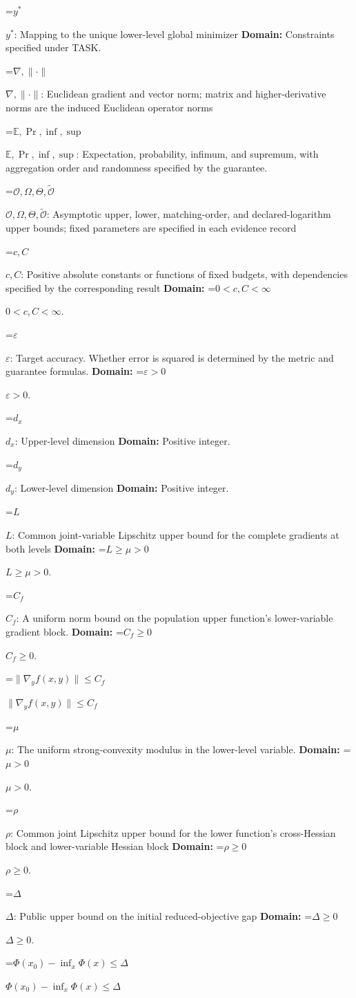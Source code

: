 \documentclass[10pt,a4paper]{article}
\newcommand{\AtlasMath}[1]{\par\begingroup\centering\setbox0=\hbox{$\displaystyle #1$}\ifdim\wd0>1.4\linewidth\typeout{ATLAS WIDE FORMULA: \the\wd0}\fi\ifdim\wd0>\linewidth\resizebox{\linewidth}{!}{\box0}\else\box0\fi\par\endgroup}
\newcommand{\AtlasInlineMath}[1]{\begingroup\setbox0=\hbox{$#1$}\ifdim\wd0>.4\linewidth\endgroup\AtlasMath{#1}\else\endgroup$#1$\fi}
\begin{document}
\AtlasInlineMath{y^*}: Mapping to the unique lower-level global minimizer \textbf{Domain:} Constraints specified under TASK.

\AtlasInlineMath{\nabla,\|\cdot\|}: Euclidean gradient and vector norm; matrix and higher-derivative norms are the induced Euclidean operator norms

\AtlasInlineMath{\mathbb E,\Pr,\inf,\sup}: Expectation, probability, infimum, and supremum, with aggregation order and randomness specified by the guarantee.

\AtlasInlineMath{\mathcal O,\Omega,\Theta,\widetilde{\mathcal O}}: Asymptotic upper, lower, matching-order, and declared-logarithm upper bounds; fixed parameters are specified in each evidence record

\AtlasInlineMath{c,C}: Positive absolute constants or functions of fixed budgets, with dependencies specified by the corresponding result \textbf{Domain:} \AtlasInlineMath{0<c,C<\infty}.

\AtlasInlineMath{\varepsilon}: Target accuracy. Whether error is squared is determined by the metric and guarantee formulas. \textbf{Domain:} \AtlasInlineMath{\varepsilon>0}.

\AtlasInlineMath{d_x}: Upper-level dimension \textbf{Domain:} Positive integer.

\AtlasInlineMath{d_y}: Lower-level dimension \textbf{Domain:} Positive integer.

\AtlasInlineMath{L}: Common joint-variable Lipschitz upper bound for the complete gradients at both levels \textbf{Domain:} \AtlasInlineMath{L\ge\mu>0}.

\AtlasInlineMath{C_f}: A uniform norm bound on the population upper function’s lower-variable gradient block. \textbf{Domain:} \AtlasInlineMath{C_f\ge0}.

\AtlasInlineMath{\|\nabla_yf(x,y)\|\le C_f}

\AtlasInlineMath{\mu}: The uniform strong-convexity modulus in the lower-level variable. \textbf{Domain:} \AtlasInlineMath{\mu>0}.

\AtlasInlineMath{\rho}: Common joint Lipschitz upper bound for the lower function's cross-Hessian block and lower-variable Hessian block \textbf{Domain:} \AtlasInlineMath{\rho\ge0}.

\AtlasInlineMath{\Delta}: Public upper bound on the initial reduced-objective gap \textbf{Domain:} \AtlasInlineMath{\Delta\ge0}.

\AtlasInlineMath{\Phi(x_0)-\inf_x\Phi(x)\le\Delta}
\end{document}
